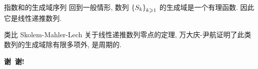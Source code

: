 \documentclass[aspectratio=169,handout]{ctexbeamer}
\begin{document}
\begin{frame}{指数和的生成域序列}
回到一般情形, 数列 ${\left\{S_k\right\}}_{k\geqslant 1}$ 的生成域是一个有理函数.
因此它是线性递推数列.

类比 Skolem-Mahler-Lech 关于线性递推数列零点的定理, 万大庆-尹航证明了此类数列的生成域除有限多项外, 是周期的.
\end{frame}









{
	\setnaviboxempty
	\begin{frame}
		\begin{center}
			\huge \textbf{谢~谢!}
		\end{center}
	\end{frame}
}
\end{document}
